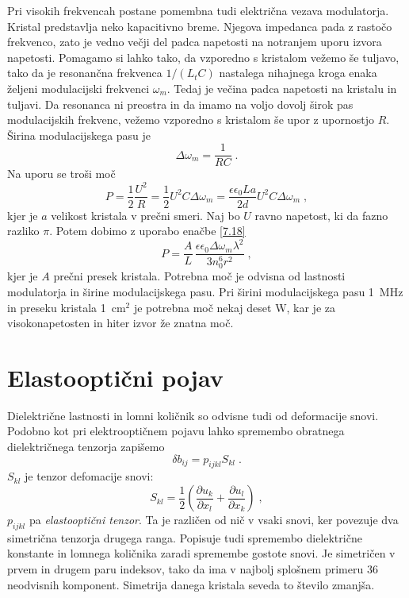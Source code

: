 \documentclass[11pt,fleqn]{book} %
\begin{document}
Pri visokih frekvencah postane pomembna tudi električna vezava modulatorja.
Kristal predstavlja neko kapacitivno breme. Njegova impedanca pada
z rastočo frekvenco, zato je vedno večji del padca napetosti na notranjem
uporu izvora napetosti. Pomagamo si lahko tako, da vzporedno s kristalom
vežemo še tuljavo, tako da je resonančna frekvenca $1/(L_{t}C)$ nastalega
nihajnega kroga enaka željeni modulacijski frekvenci $\omega_{m}$.
Tedaj je večina padca napetosti na kristalu in tuljavi. Da resonanca
ni preostra in da imamo na voljo dovolj širok pas modulacijskih frekvenc,
vežemo vzporedno s kristalom še upor z upornostjo $R$. Širina modulacijskega
pasu je 
\begin{equation}
\Delta\omega_{m}=\frac{1}{RC}\;.\label{7.24}
\end{equation}
 Na uporu se troši moč 
\begin{equation}
P=\frac{1}{2}\frac{U^{2}}{R}=\frac{1}{2}U^{2}C\Delta\omega_{m}=\frac{\epsilon\epsilon_{0}La}{2d}U^{2}C\Delta\omega_{m}\;,\label{7.25}
\end{equation}
 kjer je $a$ velikost kristala v prečni smeri. Naj bo $U$ ravno
napetost, ki da fazno razliko $\pi$. Potem dobimo z uporabo enačbe
\ref{7.18} 
\begin{equation}
P=\frac{A}{L}\,\frac{\epsilon\epsilon_{0}\Delta\omega_{m}\lambda^{2}}{3n_{0}^{6}r^{2}}\;,\label{7.26}
\end{equation}
 kjer je $A$ prečni presek kristala. Potrebna moč je odvisna od lastnosti
modulatorja in širine modulacijskega pasu. Pri širini modulacijskega
pasu 1~MHz in preseku kristala 1~cm$^{2}$ je potrebna moč nekaj
deset W, kar je za visokonapetosten in hiter izvor že znatna moč.


\section{Elastooptični pojav}

Dielektrične lastnosti in lomni količnik so odvisne tudi od deformacije
snovi. Podobno kot pri elektrooptičnem pojavu lahko spremembo obratnega
dielektričnega tenzorja zapišemo 
\begin{equation}
\delta b_{ij}=p_{ijkl}S_{kl}\;.\label{7.27}
\end{equation}
 $S_{kl}$ je tenzor defomacije snovi: 
\begin{equation}
S_{kl}=\frac{1}{2}\left({\frac{\partial u_{k}}{\partial x_{l}}}+{\frac{\partial u_{l}}{\partial x_{k}}}\right)\;,\label{7.28}
\end{equation}
 $p_{ijkl}$ pa \textit{elastooptični tenzor}. Ta je različen od nič
v vsaki snovi, ker povezuje dva simetrična tenzorja drugega ranga.
Popisuje tudi spremembo dielektrične konstante in lomnega količnika
zaradi spremembe gostote snovi. Je simetričen v prvem in drugem paru
indeksov, tako da ima v najbolj splošnem primeru 36 neodvisnih komponent.
Simetrija danega kristala seveda to število zmanjša.
\end{document}
